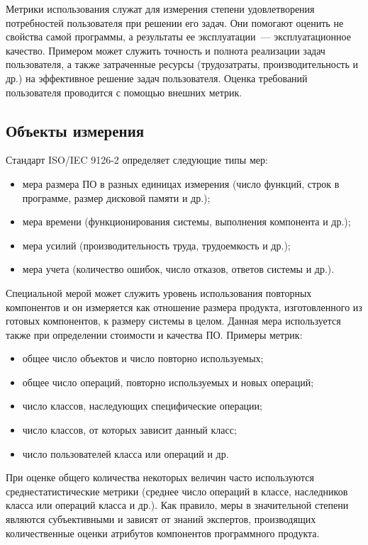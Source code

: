 \documentclass{../../text-style}
\begin{document}
Метрики использования служат для измерения степени удовлетворения потребностей пользователя при решении его задач. Они помогают оценить не свойства самой программы, а результаты ее эксплуатации~--- эксплуатационное качество. Примером может служить точность и полнота реализации задач пользователя, а также затраченные ресурсы (трудозатраты, производительность и др.) на эффективное решение задач пользователя. Оценка требований пользователя проводится с помощью внешних метрик.

\subsection{Объекты измерения}

Стандарт ISO/IEC 9126-2 определяет следующие типы мер:

\begin{itemize}
    \item мера размера ПО в разных единицах измерения (число функций, строк в программе, размер дисковой памяти и др.);
    \item мера времени (функционирования системы, выполнения компонента и др.);
    \item мера усилий (производительность труда, трудоемкость и др.);
    \item мера учета (количество ошибок, число отказов, ответов системы и др.).
\end{itemize}

Специальной мерой может служить уровень использования повторных компонентов и он измеряется как отношение размера продукта, изготовленного из готовых компонентов, к размеру системы в целом. Данная мера используется также при определении стоимости и качества ПО. Примеры метрик:

\begin{itemize}
    \item общее число объектов и число повторно используемых;
    \item общее число операций, повторно используемых и новых операций;
    \item число классов, наследующих специфические операции;
    \item число классов, от которых зависит данный класс;
    \item число пользователей класса или операций и др.
\end{itemize}

При оценке общего количества некоторых величин часто используются среднестатистические метрики (среднее число операций в классе, наследников класса или операций класса и др.). Как правило, меры в значительной степени являются субъективными и зависят от знаний экспертов, производящих количественные оценки атрибутов компонентов программного продукта.
\end{document}
